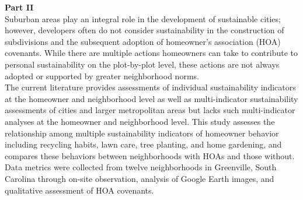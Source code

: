 \documentclass{article}
\begin{document}
\textbf{Part II}\\
Suburban areas play an integral role in the development of sustainable cities; however, developers often do not consider sustainability in the construction of subdivisions and the subsequent adoption of homeowner's association (HOA) covenants. While there are multiple actions homeowners can take to contribute to personal sustainability on the plot-by-plot level, these actions are not always adopted or supported by greater neighborhood norms. \\

The current literature provides assessments of individual sustainability indicators at the homeowner and neighborhood level as well as multi-indicator sustainability assessments of cities and larger metropolitan areas but lacks such multi-indicator analyses at the homeowner and neighborhood level. This study assesses the relationship among multiple sustainability indicators of homeowner behavior including recycling habits, lawn care, tree planting, and home gardening, and compares these behaviors between neighborhoods with HOAs and those without. Data metrics were collected from twelve neighborhoods in Greenville, South Carolina through on-site observation, analysis of Google Earth images, and qualitative assessment of HOA covenants.\\
\end{document}
